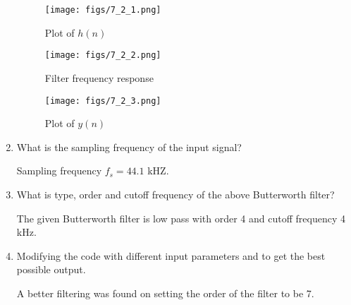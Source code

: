 \documentclass[journal,12pt,twocolumn]{IEEEtran}
\renewcommand\thesection{\arabic{section}}
\begin{document}
\begin{enumerate}[label=\thesection.\arabic*]
\begin{figure}[!htb]
	\texttt{[image: figs/7\_2\_1.png]}
	\caption{Plot of $h(n)$}
	\label{fig:butter-imp}
\end{figure}

\begin{figure}[!htb]
	\texttt{[image: figs/7\_2\_2.png]}
	\caption{Filter frequency response}
	\label{fig:butter-resp}
\end{figure}

\begin{figure}[!htb]
	\texttt{[image: figs/7\_2\_3.png]}
	\caption{Plot of $y(n)$}
	\label{fig:butter-out}
\end{figure}

\item What is the sampling frequency of the input signal?

\solution
Sampling frequency $f_s = 44.1$ kHZ.
\item
What is type, order and  cutoff frequency of the above Butterworth filter?

\solution
The given Butterworth filter is low pass with order 4 and cutoff frequency 4 kHz.
\item
Modifying the code with different input parameters and to get the best possible output.

\solution
A better filtering was found on setting the order of the filter to be 7.
\end{enumerate}
\end{document}
